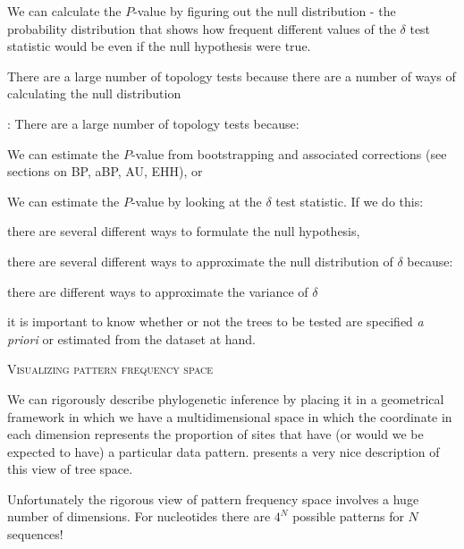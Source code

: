 \documentclass[11pt]{article}
\renewcommand{\section}[2]{%
\bigskip
\begin{center}
\begin{Large}
\normalfont\scshape #2
\medskip
\end{Large}
\end{center}}
\renewcommand{\subsection}[1]{%
\noindent{\large\scshape \underline{#1}}:}
\newcommand{\pvalue}{$P$-value\xspace}
\begin{document}
We can calculate the \pvalue by figuring out the null distribution - the probability distribution that shows how frequent different values of the $\delta$ test statistic would be even if the null hypothesis were true.

There are a large number of topology tests because there are a number of ways of calculating the null distribution

\subsection{The plethora of topology tests}
There are a large number of topology tests because:
\begin{compactitem}
	\item We can estimate the \pvalue from bootstrapping and associated corrections (see sections on BP, aBP, AU, EHH), or
	\item We can estimate the \pvalue by looking at the $\delta$ test statistic. If we do this:
	\begin{compactitem}
		\item there are several different ways to formulate the null hypothesis,
		\item there are several different ways to approximate the null distribution of $\delta$ because:
		\begin{compactitem}
			\item there are different ways to approximate the variance of $\delta$
			\item it is important to know whether or not the trees to be tested are specified {\em a priori} or estimated from the dataset at hand.
		\end{compactitem}
	\end{compactitem}
\end{compactitem}
\newpage
\section*{Visualizing pattern frequency space}
We can rigorously describe phylogenetic inference by placing it in a geometrical framework in which we have a multidimensional space in which the coordinate in each dimension represents the proportion of sites that have (or would we be expected to have) a particular data pattern.  
\citet{Kim2000} presents a very nice description of this view of tree space.

Unfortunately the rigorous view of pattern frequency space involves a huge number of dimensions.  
For nucleotides there are $4^N$ possible patterns for $N$ sequences!
\end{document}
